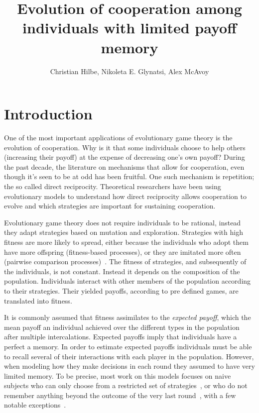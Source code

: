 \documentclass[11pt]{article}
\title{
\bf  \sffamily \LARGE Evolution of cooperation among individuals with limited payoff memory\\}
\date{}
\author{Christian Hilbe, Nikoleta E. Glynatsi, Alex McAvoy}
\theoremstyle{plainCl1}
\theoremstyle{plainCl2}
\begin{document}
\maketitle

\begin{abstract}

\end{abstract}

\section{Introduction}

One of the most important applications of evolutionary game theory is the
evolution of cooperation. Why is it that some individuals choose to help others
(increasing their payoff) at the expense of decreasing one's own payoff? During
the past decade, the literature on mechanisms that allow for cooperation, even
though it's seen to be at odd has been fruitful. One such mechanism is
repetition; the so called direct reciprocity. Theoretical researchers have been
using evolutionary models to understand how direct reciprocity allows
cooperation to evolve and which strategies are important for sustaining
cooperation.

Evolutionary game theory does not require individuals to be rational, instead
they adapt strategies based on mutation and exploration. Strategies with
high fitness are more likely to spread, either because the individuals who
adopt them have more offspring (fitness-based processes), or they are imitated
more often (pairwise comparison processes)~\cite{Wu2015}. The fitness of strategies,
and subsequently of the individuals, is not constant. Instead it depends on the
composition of the population. Individuals interact with other members of the
population according to their strategies. Their yielded payoffs, according to
pre defined games, are translated into fitness.

It is commonly assumed that fitness assimilates to the \textit{expected payoff},
which the mean payoff an individual achieved over the different types in the
population after multiple intercalations. Expected payoffs imply that
individuals have a perfect a memory. In order to estimate expected payoffs
individuals must be able to recall several of their interactions with each
player in the population. However, when modeling how they make decisions in each
round they assumed to have very limited memory. To be precise, most work on this
models focuses on naive subjects who can only choose from a restricted set of
strategies~\cite{Nowak1992tit}, or who do not remember anything beyond the
outcome of the very last round~\cite{Baek2016}, with a few notable
exceptions~\cite{Hauert1997, Stewart2016}.
\end{document}
